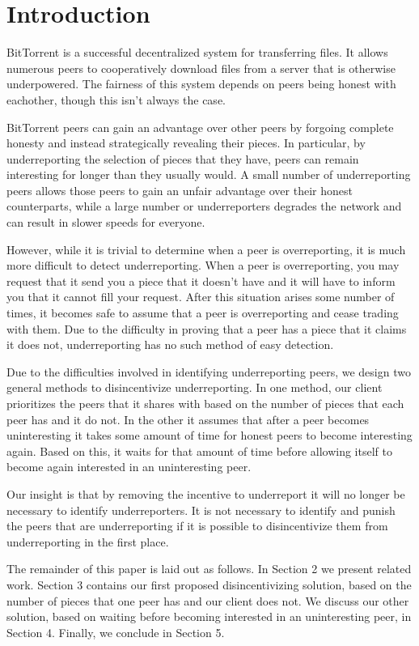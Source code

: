 \section{Introduction}

BitTorrent is a successful decentralized system for transferring files. It allows numerous peers to cooperatively download files from a server that is otherwise underpowered. The fairness of this system depends on peers being honest with eachother, though this isn't always the case.

BitTorrent peers can gain an advantage over other peers by forgoing complete honesty and instead strategically revealing their pieces. In particular, by underreporting the selection of pieces that they have, peers can remain interesting for longer than they usually would. A small number of underreporting peers allows those peers to gain an unfair advantage over their honest counterparts, while a large number or underreporters degrades the network and can result in slower speeds for everyone.

However, while it is trivial to determine when a peer is overreporting, it is much more difficult to detect underreporting. When a peer is overreporting, you may request that it send you a piece that it doesn't have and it will have to inform you that it cannot fill your request. After this situation arises some number of times, it becomes safe to assume that a peer is overreporting and cease trading with them. Due to the difficulty in proving that a peer has a piece that it claims it does not, underreporting has no such method of easy detection.

Due to the difficulties involved in identifying underreporting peers, we design two general methods to disincentivize underreporting. In one method, our client prioritizes the peers that it shares with based on the number of pieces that each peer has and it do not. In the other it assumes that after a peer becomes uninteresting it takes some amount of time for honest peers to become interesting again. Based on this, it waits for that amount of time before allowing itself to become again interested in an uninteresting peer.

Our insight is that by removing the incentive to underreport it will no longer be necessary to identify underreporters. It is not necessary to identify and punish the peers that are underreporting if it is possible to disincentivize them from underreporting in the first place.

The remainder of this paper is laid out as follows. In Section 2 we present related work. Section 3 contains our first proposed disincentivizing solution, based on the number of pieces that one peer has and our client does not. We discuss our other solution, based on waiting before becoming interested in an uninteresting peer, in Section 4. Finally, we conclude in Section 5.

